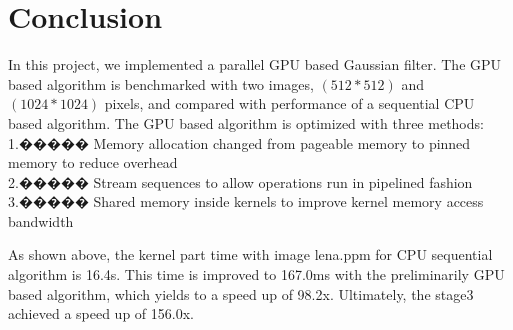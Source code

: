 \documentclass[journal,11pt,onecolumn,draftclsnofoot]{ieeeconf}  %
\begin{document}
\section{Conclusion} 
In this project, we implemented a parallel GPU based Gaussian filter. The GPU based algorithm is benchmarked with two images, $(512*512)$ and $(1024*1024)$ pixels, and compared with performance of a sequential CPU based algorithm. The GPU based algorithm is optimized with three methods: \\
1.����� Memory allocation changed from pageable memory to pinned memory to reduce overhead\\
2.����� Stream sequences to allow operations run in pipelined fashion \\
3.����� Shared memory inside kernels to improve kernel memory access bandwidth\par

As shown above, the kernel part time with image lena.ppm for CPU sequential algorithm is 16.4s. This time is improved to 167.0ms with the preliminarily GPU based algorithm, which yields to a speed up of 98.2x. Ultimately, the stage3 achieved a speed up of 156.0x.

\clearpage
\appendix
\end{document}

